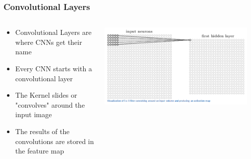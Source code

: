 \documentclass{beamer}
\begin{document}
\begin{frame}
	\frametitle{Convolutional Layers}
	
  \begin{columns}
  \begin{column}{0.6\textwidth}
  \begin{itemize}
	\item Convolutional Layers are where CNNs get their name
	\item Every CNN starts with a convolutional layer
	\item The Kernel slides or "convolves" around the input image
	\item The results of the convolutions are stored in the feature map
  \end{itemize}
  \end{column}
  \begin{column}{0.4\textwidth}
   \includegraphics[width=0.95\textwidth]{ActivationMap.png}
       \\
  \end{column}
  \end{columns}
\end{frame}
\end{document}
